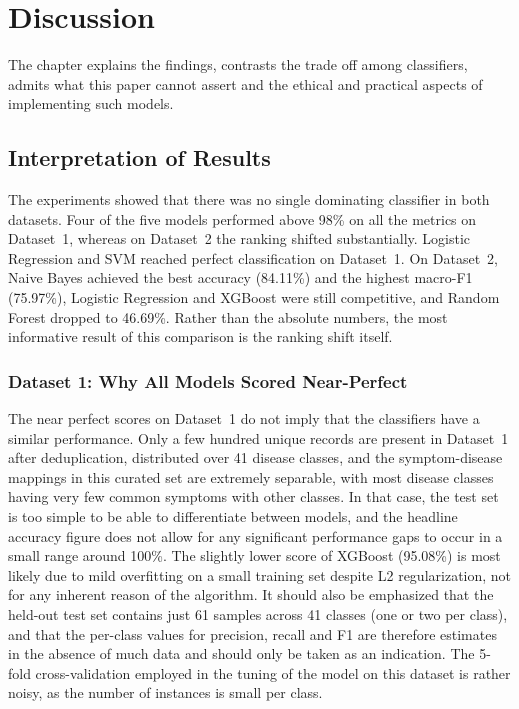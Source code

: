 \chapter{Discussion}
\label{ch:discussion}

The chapter explains the findings, contrasts the trade off among classifiers, admits what this paper cannot assert and the ethical and practical aspects of implementing such models.

\section{Interpretation of Results}
\label{sec:interpretation}

The experiments showed that there was no single dominating classifier in both datasets. Four of the five models performed above 98\% on all the metrics on Dataset~1, whereas on Dataset~2 the ranking shifted substantially. Logistic Regression and SVM reached perfect classification on Dataset~1. On Dataset~2, Naive Bayes achieved the best accuracy (84.11\%) and the highest macro-F1 (75.97\%), Logistic Regression and XGBoost were still competitive, and Random Forest dropped to 46.69\%. Rather than the absolute numbers, the most informative result of this comparison is the ranking shift itself.

\subsection{Dataset 1: Why All Models Scored Near-Perfect}

The near perfect scores on Dataset~1 do not imply that the classifiers have a similar performance. Only a few hundred unique records are present in Dataset~1 after deduplication, distributed over 41 disease classes, and the symptom-disease mappings in this curated set are extremely separable, with most disease classes having very few common symptoms with other classes. In that case, the test set is too simple to be able to differentiate between models, and the headline accuracy figure does not allow for any significant performance gaps to occur in a small range around 100\%. The slightly lower score of XGBoost (95.08\%) is most likely due to mild overfitting on a small training set despite L2 regularization, not for any inherent reason of the algorithm. It should also be emphasized that the held-out test set contains just 61 samples across 41 classes (one or two per class), and that the per-class values for precision, recall and F1 are therefore estimates in the absence of much data and should only be taken as an indication. The 5-fold cross-validation employed in the tuning of the model on this dataset is rather noisy, as the number of instances is small per class.


